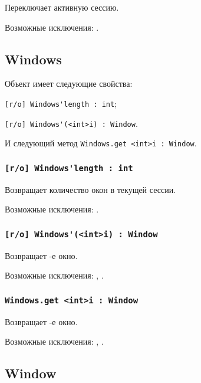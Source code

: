 Переключает активную сессию.

Возможные исключения: .


\subsection{{\color{orange} Windows}}

Объект \windows{} имеет следующие свойства:
\begin{icItems}
	\item \lstinline|[r/o] Windows'length : int|;
	\item \lstinline|[r/o] Windows'(<int>i) : Window|.
\end{icItems}

И следующий метод \lstinline|Windows.get <int>i : Window|.

\subsubsection{\lstinline|[r/o] Windows'length : int|}

Возвращает количество окон в текущей сессии.

Возможные исключения: .

\subsubsection{\lstinline|[r/o] Windows'(<int>i) : Window|}

Возвращает -е окно.

Возможные исключения: , .

\subsubsection{\lstinline|Windows.get <int>i : Window|}

Возвращает -е окно.

Возможные исключения: , .

\subsection{{\color{orange} Window}}


